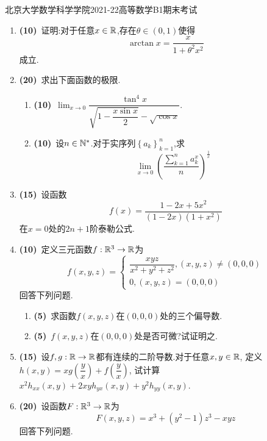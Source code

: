 \documentclass{ctexart}
\begin{document}
\pagestyle{empty}

\begin{center}\Large
    北京大学数学科学学院2021-22高等数学B1期末考试
\end{center}
\begin{enumerate}[leftmargin=*,label=\textbf{\arabic*.}]
    \item \textbf{(10)}\ 证明:对于任意$x\in\mathbb{R}$,存在$\theta\in(0,1)$使得
        \[\arctan x=\dfrac{x}{1+\theta^2x^2}\]
        成立.
    \item \textbf{(20)}\ 求出下面函数的极限.
        \begin{enumerate}[label=\textbf{(\arabic*)},leftmargin=*]
            \item \textbf{(10)}\ $\displaystyle\lim_{x\to0}\dfrac{\tan^4x}{\sqrt{1-\dfrac{x\sin x}{2}}-\sqrt{\cos x}}$.
            \item \textbf{(10)}\ 设$n\in\mathbb{N}^*$.对于实序列$\left\{a_k\right\}_{k=1}^n$,求\[\lim_{x\to0}\left(\dfrac{\sum_{k=1}^na_k^x}{n}\right)^{\frac{1}{x}}\]
        \end{enumerate}
    \item \textbf{(15)}\ 设函数\[f(x)=\dfrac{1-2x+5x^2}{(1-2x)(1+x^2)}\]在$x=0$处的$2n+1$阶泰勒公式.
    \item \textbf{(10)}\ 定义三元函数$f:\mathbb{R}^3\to\mathbb{R}$为\[f(x,y,z)=\left\{\begin{array}{l}
            \dfrac{xyz}{x^2+y^2+z^2},(x,y,z)\neq(0,0,0)\\
            0,(x,y,z)=(0,0,0)
        \end{array}\right.\]回答下列问题.
        \begin{enumerate}[label=\textbf{(\arabic*)},leftmargin=*]
            \item \textbf{(5)}\ 求函数$f(x,y,z)$在$(0,0,0)$处的三个偏导数.
            \item \textbf{(5)}\ $f(x,y,z)$在$(0,0,0)$处是否可微?试证明之.
        \end{enumerate}
    \item \textbf{(15)}\ 设$f,g:\mathbb{R}\to\mathbb{R}$都有连续的二阶导数.对于任意$x,y\in\mathbb{R}$,
        定义$h(x,y)=xg\left(\dfrac{y}{x}\right)+f\left(\dfrac{y}{x}\right)$,
        试计算$x^2h_{xx}(x,y)+2xyh_{yx}(x,y)+y^2h_{yy}(x,y)$.
    \item \textbf{(20)}\ 设函数$F:\mathbb{R}^3\to\mathbb{R}$为\[F(x,y,z)=x^3+(y^2-1)z^3-xyz\]回答下列问题.
        \begin{enumerate}[label=\textbf{(\arabic*)},leftmargin=*]

\end{enumerate}
\end{enumerate}
\end{document}
